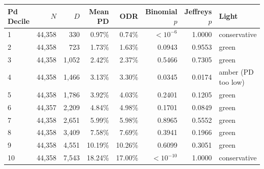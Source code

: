 \begin{tabular}{lrrrrrrl}
\toprule
Pd Decile & $N$ & $D$ & Mean PD & ODR & Binomial $p$ & Jeffreys $p$ & Light \\
\midrule
1 & 44,358 & 330 & 0.97\% & 0.74\% & $<10^{-6}$ & 1.0000 & conservative \\
2 & 44,358 & 723 & 1.73\% & 1.63\% & 0.0943 & 0.9553 & green \\
3 & 44,358 & 1,052 & 2.42\% & 2.37\% & 0.5466 & 0.7305 & green \\
4 & 44,358 & 1,466 & 3.13\% & 3.30\% & 0.0345 & 0.0174 & amber (PD too low) \\
5 & 44,358 & 1,786 & 3.92\% & 4.03\% & 0.2401 & 0.1205 & green \\
6 & 44,357 & 2,209 & 4.84\% & 4.98\% & 0.1701 & 0.0849 & green \\
7 & 44,358 & 2,651 & 5.99\% & 5.98\% & 0.8965 & 0.5552 & green \\
8 & 44,358 & 3,409 & 7.58\% & 7.69\% & 0.3941 & 0.1966 & green \\
9 & 44,358 & 4,551 & 10.19\% & 10.26\% & 0.6099 & 0.3051 & green \\
10 & 44,358 & 7,543 & 18.24\% & 17.00\% & $<10^{-10}$ & 1.0000 & conservative \\
\bottomrule
\end{tabular}
